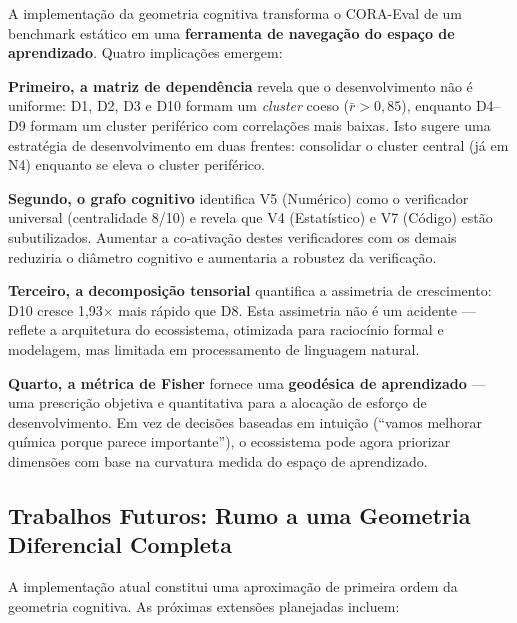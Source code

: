 A implementação da geometria cognitiva transforma o CORA-Eval de um benchmark
estático em uma \textbf{ferramenta de navegação do espaço de aprendizado}.
Quatro implicações emergem:

\textbf{Primeiro, a matriz de dependência} revela que o desenvolvimento não
é uniforme: D1, D2, D3 e D10 formam um \textit{cluster} coeso ($\bar{r} >
0,85$), enquanto D4--D9 formam um cluster periférico com correlações mais
baixas. Isto sugere uma estratégia de desenvolvimento em duas frentes:
consolidar o cluster central (já em N4) enquanto se eleva o cluster periférico.

\textbf{Segundo, o grafo cognitivo} identifica V5 (Numérico) como o verificador
universal (centralidade 8/10) e revela que V4 (Estatístico) e V7 (Código)
estão subutilizados. Aumentar a co-ativação destes verificadores com os demais
reduziria o diâmetro cognitivo e aumentaria a robustez da verificação.

\textbf{Terceiro, a decomposição tensorial} quantifica a assimetria de
crescimento: D10 cresce 1,93$\times$ mais rápido que D8. Esta assimetria não é
um acidente — reflete a arquitetura do ecossistema, otimizada para raciocínio
formal e modelagem, mas limitada em processamento de linguagem natural.

\textbf{Quarto, a métrica de Fisher} fornece uma \textbf{geodésica de
aprendizado} — uma prescrição objetiva e quantitativa para a alocação de
esforço de desenvolvimento. Em vez de decisões baseadas em intuição (``vamos
melhorar química porque parece importante''), o ecossistema pode agora
priorizar dimensões com base na curvatura medida do espaço de aprendizado.

\subsection{Trabalhos Futuros: Rumo a uma Geometria Diferencial Completa}

A implementação atual constitui uma aproximação de primeira ordem da geometria
cognitiva. As próximas extensões planejadas incluem:

